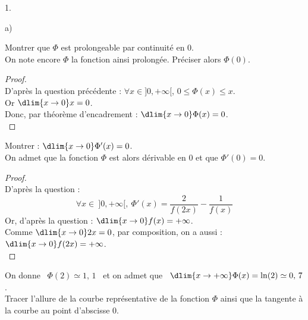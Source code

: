 \begin{noliste}{1.}
  \item 
  \begin{noliste}{a)}
    \setlength{\itemsep}{2mm}
    \item Montrer que $\Phi$ est prolongeable par continuité en $0$.\\
    On note encore $\Phi$ la fonction ainsi prolongée. Préciser alors 
    $\Phi(0)$.
    
    \begin{proof}~\\
      D'après la question précédente : $\forall x \in ]0,+\infty[$, 
      $0 \leq \Phi(x) \leq x$.\\
      Or $\dlim{x\to 0} x = 0$.\\
      Donc, par théorème d'encadrement : $\dlim{x\to 0} \Phi(x) =0$.
      ~\\[-1cm]
    \end{proof}

    
  \item Montrer : $\dlim{x\to 0} \Phi'(x) =0$.\\
    On admet que la fonction $\Phi$ est alors dérivable en $0$ et que
    $\Phi'(0)=0$.
    
    \begin{proof}~\\
      D'après la question  :
      \[
        \forall x \in \ ]0,+\infty[, \ \Phi'(x) = \dfrac{2}{f(2x)}
        - \dfrac{1}{f(x)}
      \]
      Or, d'après la question  : $\dlim{x\to 0} f(x) =
      +\infty$.\\
      Comme $\dlim{x\to 0} 2x =0$, par composition, on a aussi : 
      $\dlim{x\to 0} f(2x) = +\infty$.
      ~\\[-1cm]
    \end{proof}
  \end{noliste}
  
  
  \newpage
  
  
  \item On donne \ $\Phi(2) \simeq 1, \, 1$ \ et on admet que \ 
  $\dlim{x\to +\infty} \Phi(x) = \ln(2) \simeq 0, \, 7$.\\
  Tracer l'allure de la courbe représentative de la fonction $\Phi$ 
  ainsi que la tangente à la courbe au point d'abscisse $0$.
  

\end{noliste}
